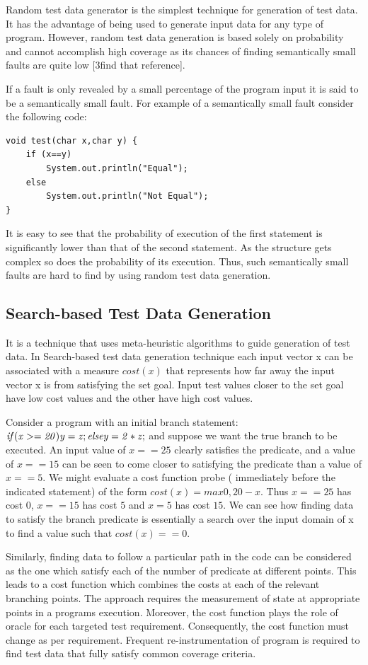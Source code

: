 Random test data generator is the simplest technique for generation of test data. It has the advantage of being used to generate input data for any type of program. However, random test data generation is based solely on probability and cannot accomplish high coverage as its chances of finding semantically small faults are quite low [3find that reference].

If a fault is only revealed by a small percentage of the program input it is said to be a semantically small fault. For example of a semantically small fault consider the following code:
\begin{lstlisting}
void test(char x,char y) {
    if (x==y)
        System.out.println("Equal");
    else
        System.out.println("Not Equal");
}
\end{lstlisting}

It is easy to see that the probability of execution of the first statement is significantly lower than that of the second statement. As the structure gets complex so does the probability of its execution. Thus, such semantically small faults are hard to find by using random test data generation. 

\subsection{Search-based Test Data Generation}
It is a technique that uses meta-heuristic algorithms to guide generation of test data. In Search-based test data generation technique each input vector x can be associated with a measure $cost(x)$ that represents how far away the input vector x is from satisfying the set goal. Input test values closer to the set goal have low cost values and the other have high cost values. 

Consider a program with an initial branch statement: ${\it{ if (x >= 20) y = z; else y = 2 * z;}}$ and suppose we want the true branch to be executed. An input value of $x == 25$ clearly satisfies the predicate, and a value of $x == 15$ can be seen to come closer to satisfying the predicate than a value of $x ==5$. We might evaluate a cost function probe ( immediately before the indicated statement) of the form $cost(x) = max {0, 20 - x}$. Thus $x == 25$ has cost $0$, $x == 15$ has cost $5$ and $x = 5$ has cost $15$. We can see how finding data to satisfy the branch predicate is essentially a search over the input domain of x to find a value such that $cost(x) == 0$. 

Similarly, finding data to follow a particular path in the code can be considered as the one which satisfy each of the number of predicate at different points. This leads to a cost function which combines the costs at each of the relevant branching points. The approach requires the measurement of state at appropriate points in a programs execution. Moreover, the cost function plays the role of oracle for each targeted test requirement. Consequently, the cost function must change as per requirement. Frequent re-instrumentation of program is required to find test data that fully satisfy common coverage criteria. 

